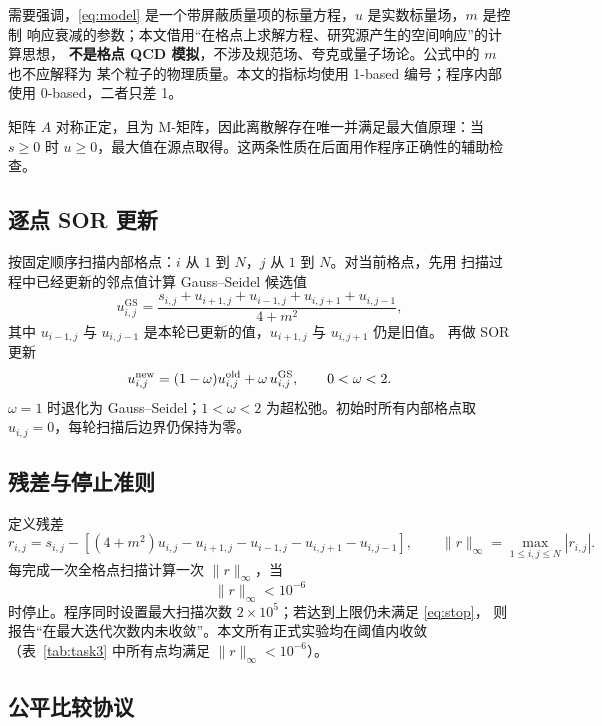 \documentclass[UTF8,fontset=windows,a4paper,11pt]{ctexart}
\newcommand{\GS}{\mathrm{GS}}
\begin{document}
需要强调，\eqref{eq:model} 是一个带屏蔽质量项的标量方程，$u$ 是实数标量场，$m$ 是控制
响应衰减的参数；本文借用“在格点上求解方程、研究源产生的空间响应”的计算思想，
\textbf{不是格点 QCD 模拟}，不涉及规范场、夸克或量子场论。公式中的 $m$ 也不应解释为
某个粒子的物理质量。本文的指标均使用 1-based 编号；程序内部使用 0-based，二者只差 1。

矩阵 $A$ 对称正定，且为 M-矩阵，因此离散解存在唯一并满足最大值原理：当 $s\ge0$ 时
$u\ge0$，最大值在源点取得。这两条性质在后面用作程序正确性的辅助检查。

\subsection{逐点 SOR 更新}

按固定顺序扫描内部格点：$i$ 从 $1$ 到 $N$，$j$ 从 $1$ 到 $N$。对当前格点，先用
扫描过程中已经更新的邻点值计算 Gauss--Seidel 候选值
\begin{equation}
u_{i,j}^{\GS}
=\frac{s_{i,j}+u_{i+1,j}+u_{i-1,j}+u_{i,j+1}+u_{i,j-1}}{4+m^2},
\label{eq:gs}
\end{equation}
其中 $u_{i-1,j}$ 与 $u_{i,j-1}$ 是本轮已更新的值，$u_{i+1,j}$ 与 $u_{i,j+1}$ 仍是旧值。
再做 SOR 更新
\begin{equation}
u_{i,j}^{\rm new}=(1-\omega)u_{i,j}^{\rm old}+\omega\,u_{i,j}^{\GS},
\qquad 0<\omega<2 .
\label{eq:sor}
\end{equation}
$\omega=1$ 时退化为 Gauss--Seidel；$1<\omega<2$ 为超松弛。初始时所有内部格点取
$u_{i,j}=0$，每轮扫描后边界仍保持为零。

\subsection{残差与停止准则}

定义残差
\begin{equation}
r_{i,j}=s_{i,j}-\left[(4+m^2)u_{i,j}-u_{i+1,j}-u_{i-1,j}-u_{i,j+1}-u_{i,j-1}\right],
\qquad
\|r\|_\infty=\max_{1\le i,j\le N}|r_{i,j}| .
\label{eq:residual}
\end{equation}
每完成一次全格点扫描计算一次 $\|r\|_\infty$，当
\begin{equation}
\|r\|_\infty<10^{-6}
\label{eq:stop}
\end{equation}
时停止。程序同时设置最大扫描次数 $2\times10^{5}$；若达到上限仍未满足 \eqref{eq:stop}，
则报告“在最大迭代次数内未收敛”。本文所有正式实验均在阈值内收敛（表~\ref{tab:task3}
中所有点均满足 $\|r\|_\infty<10^{-6}$）。

\subsection{公平比较协议}
\end{document}
